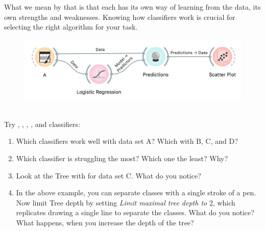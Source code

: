  What we mean by that is that each has its own way of learning from the data, its own strengths and weaknesses. Knowing how classifiers work is crucial for selecting the right algorithm for your task.

\begin{figure}[h]
    \centering
    \includegraphics[width=\textwidth]{workflow.png}%
    \caption{$\;$}
  \end{figure}

Try , , , , and  classifiers:
\begin{enumerate}
    \item Which classifiers work well with data set A? Which with B, C, and D?
    \item Which classifier is struggling the most? Which one the least? Why?
    \item Look at the Tree with  for data set C. What do you notice?
    \item In the above example, you can separate classes with a single stroke of a pen. Now limit Tree depth by setting \textit{Limit maximal tree depth to} 2, which replicates drawing a single line to separate the classes. What do you notice? What happens, when you increase the depth of the tree?
\end{enumerate}
